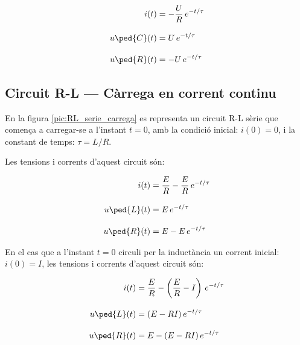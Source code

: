 \hfill
\begin{minipage}[b]{9cm}
    
\end{minipage}
\hfill
\begin{minipage}[b]{6cm}
    \begin{align}
        i(t) &= - \frac{U}{R}\,e^{-t/\tau} \\[3mm]
        u\ped{C}(t) &= U\,e^{-t/\tau} \\[3mm]
        u\ped{R}(t) &= - U\,e^{-t/\tau}
    \end{align}
\end{minipage}


\subsection{Circuit R-L --- Càrrega en corrent continu}\label{sec:RL-carrega}

En la figura \vref{pic:RL_serie_carrega} es representa un circuit R-L sèrie que comença a carregar-se a l'instant $t=0$, amb la condició inicial: $i(0) = 0$, i la constant de temps: $\tau = L/R$.
\begin{center}
    
    \label{pic:RL_serie_carrega}
\end{center}

Les tensions i corrents d'aquest circuit són:

\hfill
\begin{minipage}[b]{9cm}
    
\end{minipage}
\hfill
\begin{minipage}[b]{6cm}
    \begin{align}
        i(t) &= \frac{E}{R}  - \frac{E}{R} \,e^{-t/\tau}\label{eq:RL-i-carrega} \\[3mm]
        u\ped{L}(t) &= E\,e^{-t/\tau}\label{eq:RL-ul-carrega} \\[3mm]
        u\ped{R}(t) &= E - E\,e^{-t/\tau}
    \end{align}
\end{minipage}

\vspace{5mm}
En el cas que a l'instant $t=0$ circuli per la inductància un corrent inicial: $i(0) = I$, les tensions i corrents d'aquest circuit són:

\hfill
\begin{minipage}[b]{9cm}
    
\end{minipage}
\hfill
\begin{minipage}[b]{6cm}
    \begin{align}
        i(t) &= \frac{E}{R}  - \left(\frac{E}{R}-I\right) \,e^{-t/\tau}\label{eq:RL-i-carrega-ini} \\[3mm]
        u\ped{L}(t) &= (E- R I)\,e^{-t/\tau}\label{eq:RL-ul-carrega-ini} \\[3mm]
        u\ped{R}(t) &= E - (E-R I)\,e^{-t/\tau}
    \end{align}
\end{minipage}


